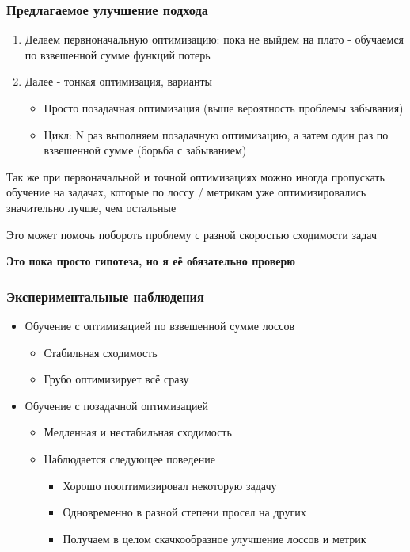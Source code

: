 \documentclass[aspectratio=169]{beamer}
\begin{document}
\begin{frame}
	\frametitle{Предлагаемое улучшение подхода}
	\begin{enumerate}
	  \item Делаем первноначальную оптимизацию: пока не выйдем на плато - обучаемся по взвешенной сумме функций потерь
	  \item Далее - тонкая оптимизация, варианты
	  \begin{itemize}
	  	\item Просто позадачная оптимизация (выше вероятность проблемы забывания)
	  	\item Цикл: N раз выполняем позадачную оптимизацию, а затем один раз по взвешенной сумме (борьба с забыванием)
	  \end{itemize}
	\end{enumerate}
	Так же при первоначальной и точной оптимизациях можно иногда пропускать обучение на задачах, которые по лоссу / метрикам уже оптимизировались значительно лучше, чем остальные

	Это может помочь побороть проблему с разной скоростью сходимости задач

	\textbf{Это пока просто гипотеза, но я её обязательно проверю}
\end{frame}

\begin{frame}
	\frametitle{Экспериментальные наблюдения}
	\begin{itemize}
		\item Обучение с оптимизацией по взвешенной сумме лоссов
		\begin{itemize}
			\item Стабильная сходимость
			\item Грубо оптимизирует всё сразу
		\end{itemize}
		\item Обучение с позадачной оптимизацией
		\begin{itemize}
			\item Медленная и нестабильная сходимость
			\item Наблюдается следующее поведение
			\begin{itemize}
				\item Хорошо пооптимизировал некоторую задачу
				\item Одновременно в разной степени просел на других 
				\item Получаем в целом скачкообразное улучшение лоссов и метрик
			\end{itemize}
		\end{itemize}
	\end{itemize}
\end{frame}
\end{document}
